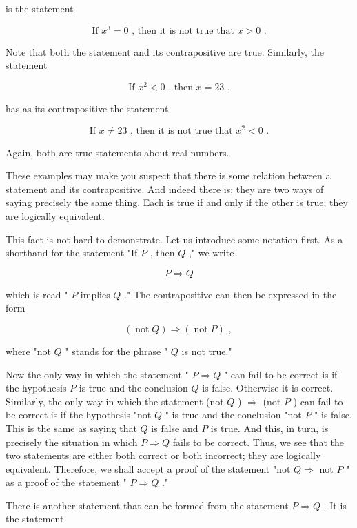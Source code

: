 \documentclass[10pt]{article}
\begin{document}
is the statement

\[
\text{ If }{x}^{3} = 0\text{ , then it is not true that }x > 0\text{ . }
\]

Note that both the statement and its contrapositive are true. Similarly, the statement

\[
\text{ If }{x}^{2} < 0\text{ , then }x = {23}\text{ , }
\]

has as its contrapositive the statement

\[
\text{ If }x \neq  {23}\text{ , then it is not true that }{x}^{2} < 0\text{ . }
\]

Again, both are true statements about real numbers.

These examples may make you suspect that there is some relation between a statement and its contrapositive. And indeed there is; they are two ways of saying precisely the same thing. Each is true if and only if the other is true; they are logically equivalent.

This fact is not hard to demonstrate. Let us introduce some notation first. As a shorthand for the statement "If \(P\) , then \(Q\) ," we write

\[
P \Rightarrow  Q
\]

which is read " \(P\) implies \(Q\) ." The contrapositive can then be expressed in the form

\[
\left( {\operatorname{not}Q}\right)  \Rightarrow  \left( {\operatorname{not}P}\right) \text{ , }
\]

where "not \(Q\) " stands for the phrase " \(Q\) is not true."

Now the only way in which the statement " \(P \Rightarrow  Q\) " can fail to be correct is if the hypothesis \(P\) is true and the conclusion \(Q\) is false. Otherwise it is correct. Similarly, the only way in which the statement (not \(Q\) ) \(\Rightarrow\) (not \(P\) ) can fail to be correct is if the hypothesis "not \(Q\) " is true and the conclusion "not \(P\) " is false. This is the same as saying that \(Q\) is false and \(P\) is true. And this, in turn, is precisely the situation in which \(P \Rightarrow  Q\) fails to be correct. Thus, we see that the two statements are either both correct or both incorrect; they are logically equivalent. Therefore, we shall accept a proof of the statement "not \(Q \Rightarrow\) not \(P\) " as a proof of the statement " \(P \Rightarrow  Q\) ."

There is another statement that can be formed from the statement \(P \Rightarrow  Q\) . It is the statement
\end{document}
